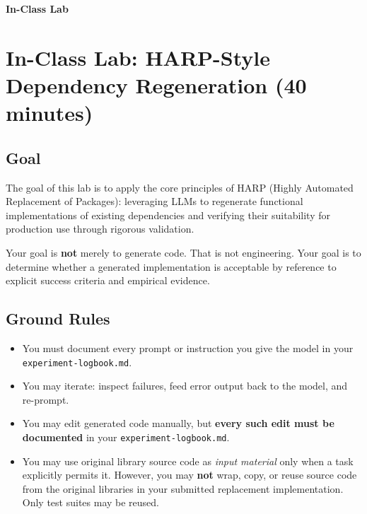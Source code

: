 \clearpage
\begin{center}
  {\Large\bfseries In-Class Lab}\\[0.5em]
\end{center}
\vspace{1em}

\section{In-Class Lab: HARP-Style Dependency Regeneration (40 minutes)}

\subsection{Goal}


The goal of this lab is to apply the core principles of HARP (Highly Automated Replacement of Packages): leveraging LLMs to regenerate functional implementations of existing dependencies and verifying their suitability for production use through rigorous validation.

Your goal is \textbf{not} merely to generate code. That is not engineering.
Your goal is to determine whether a generated implementation is acceptable by reference to
explicit success criteria and empirical evidence.

\subsection{Ground Rules}

\begin{itemize}
    \item You must document every prompt or instruction you give the model in your \texttt{experiment-logbook.md}.
    \item You may iterate: inspect failures, feed error output back to the model, and re-prompt.
    \item You may edit generated code manually, but \textbf{every such edit must be documented} in your \texttt{experiment-logbook.md}.
    \item You may use original library source code as \emph{input material} only when a task explicitly permits it.
          However, you may \textbf{not} wrap, copy, or reuse source code from the original libraries in your submitted replacement implementation.
          Only test suites may be reused.
\end{itemize}

